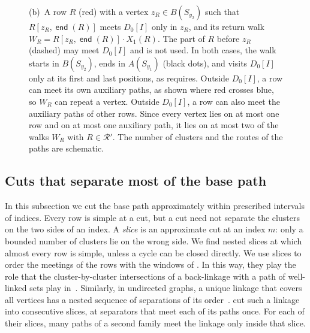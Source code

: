 \documentclass[fontsize=12pt,leading=14pt]{fullpaper}
\DeclareMathOperator{\en}{\mathsf{end}}
\newcommand{\Rcal}{\mathcal{R}}
\begin{document}
\begin{figure}[ht]
{    (b)~A row $R$ (red) with a vertex $z_R\in B(S_{y_2})$ such that $R[z_R,\en(R)]$ meets $D_0[I]$ only in $z_R$, and its return walk $W_R=R[z_R,\en(R)]\cdot X_1(R)$.
    The part of $R$ before $z_R$ (dashed) may meet $D_0[I]$ and is not used.
    In both cases, the walk starts in $B(S_{y_2})$, ends in $A(S_{y_1})$ (black dots), and visits $D_0[I]$ only at its first and last positions, as  requires.
    Outside $D_0[I]$, a row can meet its own auxiliary paths, as shown where red crosses blue, so $W_R$ can repeat a vertex.
    Outside $D_0[I]$, a row can also meet the auxiliary paths of other rows.
    Since every vertex lies on at most one row and on at most one auxiliary path, it lies on at most two of the walks $W_R$ with $R\in\Rcal'$.
  The number of clusters and the routes of the paths are schematic.}
  \label{fig:stage2-close-rows}
\end{figure}

\subsection{Cuts that separate most of the base path}\label{sec:stage2-cuts}

In this subsection we cut the base path approximately within prescribed intervals of indices.
Every row is simple at a cut, but a cut need not separate the clusters on the two sides of an index.
A \emph{slice} is an approximate cut at an index $m$: only a bounded number of clusters lie on the wrong side.
We find nested slices at which almost every row is simple, unless a cycle can be closed directly.
We use slices to order the meetings of the rows with the windows of .
In this way, they play the role that the cluster-by-cluster intersections of a back-linkage with a path of well-linked sets play in~\cite[lemmas~4.5 and~4.6]{HKMM26b}.
Similarly, in undirected graphs, a unique linkage that covers all vertices has a nested sequence of separations of its order~\cite[(3.2)]{LeafS15}.
\textcite[Theorem~4.5]{CT21} cut such a linkage into consecutive slices, at separators that meet each of its paths once.
For each of their slices, many paths of a second family meet the linkage only inside that slice.
\end{document}
